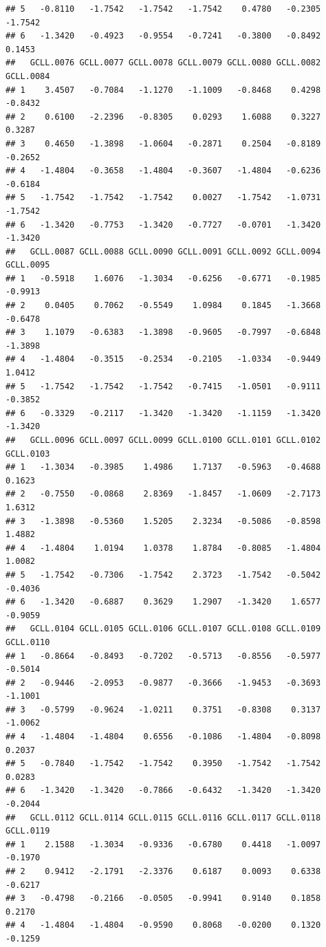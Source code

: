 \documentclass[
]{article}
\begin{document}
\begin{verbatim}
## 5   -0.8110   -1.7542   -1.7542   -1.7542    0.4780   -0.2305   -1.7542
## 6   -1.3420   -0.4923   -0.9554   -0.7241   -0.3800   -0.8492    0.1453
##   GCLL.0076 GCLL.0077 GCLL.0078 GCLL.0079 GCLL.0080 GCLL.0082 GCLL.0084
## 1    3.4507   -0.7084   -1.1270   -1.1009   -0.8468    0.4298   -0.8432
## 2    0.6100   -2.2396   -0.8305    0.0293    1.6088    0.3227    0.3287
## 3    0.4650   -1.3898   -1.0604   -0.2871    0.2504   -0.8189   -0.2652
## 4   -1.4804   -0.3658   -1.4804   -0.3607   -1.4804   -0.6236   -0.6184
## 5   -1.7542   -1.7542   -1.7542    0.0027   -1.7542   -1.0731   -1.7542
## 6   -1.3420   -0.7753   -1.3420   -0.7727   -0.0701   -1.3420   -1.3420
##   GCLL.0087 GCLL.0088 GCLL.0090 GCLL.0091 GCLL.0092 GCLL.0094 GCLL.0095
## 1   -0.5918    1.6076   -1.3034   -0.6256   -0.6771   -0.1985   -0.9913
## 2    0.0405    0.7062   -0.5549    1.0984    0.1845   -1.3668   -0.6478
## 3    1.1079   -0.6383   -1.3898   -0.9605   -0.7997   -0.6848   -1.3898
## 4   -1.4804   -0.3515   -0.2534   -0.2105   -1.0334   -0.9449    1.0412
## 5   -1.7542   -1.7542   -1.7542   -0.7415   -1.0501   -0.9111   -0.3852
## 6   -0.3329   -0.2117   -1.3420   -1.3420   -1.1159   -1.3420   -1.3420
##   GCLL.0096 GCLL.0097 GCLL.0099 GCLL.0100 GCLL.0101 GCLL.0102 GCLL.0103
## 1   -1.3034   -0.3985    1.4986    1.7137   -0.5963   -0.4688    0.1623
## 2   -0.7550   -0.0868    2.8369   -1.8457   -1.0609   -2.7173    1.6312
## 3   -1.3898   -0.5360    1.5205    2.3234   -0.5086   -0.8598    1.4882
## 4   -1.4804    1.0194    1.0378    1.8784   -0.8085   -1.4804    1.0082
## 5   -1.7542   -0.7306   -1.7542    2.3723   -1.7542   -0.5042   -0.4036
## 6   -1.3420   -0.6887    0.3629    1.2907   -1.3420    1.6577   -0.9059
##   GCLL.0104 GCLL.0105 GCLL.0106 GCLL.0107 GCLL.0108 GCLL.0109 GCLL.0110
## 1   -0.8664   -0.8493   -0.7202   -0.5713   -0.8556   -0.5977   -0.5014
## 2   -0.9446   -2.0953   -0.9877   -0.3666   -1.9453   -0.3693   -1.1001
## 3   -0.5799   -0.9624   -1.0211    0.3751   -0.8308    0.3137   -1.0062
## 4   -1.4804   -1.4804    0.6556   -0.1086   -1.4804   -0.8098    0.2037
## 5   -0.7840   -1.7542   -1.7542    0.3950   -1.7542   -1.7542    0.0283
## 6   -1.3420   -1.3420   -0.7866   -0.6432   -1.3420   -1.3420   -0.2044
##   GCLL.0112 GCLL.0114 GCLL.0115 GCLL.0116 GCLL.0117 GCLL.0118 GCLL.0119
## 1    2.1588   -1.3034   -0.9336   -0.6780    0.4418   -1.0097   -0.1970
## 2    0.9412   -2.1791   -2.3376    0.6187    0.0093    0.6338   -0.6217
## 3   -0.4798   -0.2166   -0.0505   -0.9941    0.9140    0.1858    0.2170
## 4   -1.4804   -1.4804   -0.9590    0.8068   -0.0200    0.1320   -0.1259

\end{verbatim}
\end{document}
